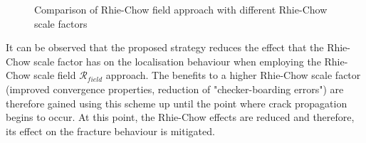 \documentclass[sn-mathphys,Numbered,draft]{sn-jnl}%
\begin{document}
\begin{figure}[t!]
	\centering
		\qquad
				\qquad
	
	\caption{Comparison of Rhie-Chow field approach with different Rhie-Chow scale factors}
	\label{Rhie-Chow Compare}
\end{figure}

It can be observed that the proposed strategy reduces the effect that the Rhie-Chow scale factor has on the localisation behaviour when employing the Rhie-Chow scale field $\mathcal{R}_{field}$ approach. The benefits to a higher Rhie-Chow scale factor (improved convergence properties, reduction of "checker-boarding errors") are therefore gained using this scheme up until the point where crack propagation begins to occur. At this point, the Rhie-Chow effects are reduced and therefore, its effect on the fracture behaviour is mitigated.
\end{document}
